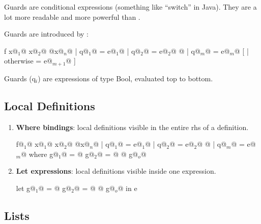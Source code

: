Guards are conditional expressions (something like ``switch'' in Java).
They are a lot more readable and more powerful than .

Guards are introduced by \codeline{|}:\\
\begin{Haskell}
f x@$_1$@ x@$_2$@ @\dots@ x@$_n$@
  | q@$_1$@     = e@$_1$@
  | q@$_2$@     = e@$_2$@
  @\dots@
  | q@$_m$@     = e@$_m$@
[ | otherwise   = e@$_{m+1}$@ ]
\end{Haskell}

Guards (q$_i$) are expressions of type Bool, evaluated top to bottom.


\subsection{Local Definitions}

\begin{enumerate}
  \item \textbf{Where bindings}: local definitions visible in the entire rhs of a definition.\\
  \begin{Haskell}
f@$_1$@ x@$_1$@ x@$_2$@ @\dots@ x@$_n$@ | q@$_1$@ = e@$_1$@
                    | q@$_2$@ = e@$_2$@ 
                    @\dots@
                    | q@$_m$@ = e@$_m$@ 
	where 
		g@$_1$@ = @\dots@
		g@$_2$@ = @\dots@
		@\dots@
		g@$_o$@
  \end{Haskell}


  \item \textbf{Let expressions}: local definitions visible inside one expression.\\
  \begin{Haskell}
let g@$_1$@ = @\dots@
    g@$_2$@ = @\dots@
    @\dots@
    g@$_o$@
in e
  \end{Haskell}
\end{enumerate}

\subsection{Lists}

